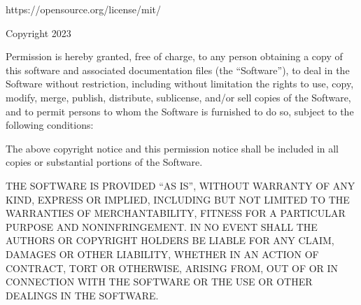 https://opensource.org/license/mit/

Copyright 2023

Permission is hereby granted, free of charge, to any person obtaining a copy of this software and associated documentation files (the “Software”), to deal in the Software without restriction, including without limitation the rights to use, copy, modify, merge, publish, distribute, sublicense, and/or sell copies of the Software, and to permit persons to whom the Software is furnished to do so, subject to the following conditions:

The above copyright notice and this permission notice shall be included in all copies or substantial portions of the Software.

THE SOFTWARE IS PROVIDED “AS IS”, WITHOUT WARRANTY OF ANY KIND, EXPRESS OR IMPLIED, INCLUDING BUT NOT LIMITED TO THE WARRANTIES OF MERCHANTABILITY, FITNESS FOR A PARTICULAR PURPOSE AND NONINFRINGEMENT. IN NO EVENT SHALL THE AUTHORS OR COPYRIGHT HOLDERS BE LIABLE FOR ANY CLAIM, DAMAGES OR OTHER LIABILITY, WHETHER IN AN ACTION OF CONTRACT, TORT OR OTHERWISE, ARISING FROM, OUT OF OR IN CONNECTION WITH THE SOFTWARE OR THE USE OR OTHER DEALINGS IN THE SOFTWARE.